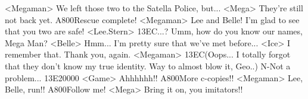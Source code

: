 <Megaman> We left those two to the Satella Police, but... 
<Mega> They're still not back yet. 
{A8}{00}Rescue complete! 
<Megaman> Lee and Belle! I'm glad to see that you two are safe! 
<Lee.Stern> {13}{EC}...? 
Umm, how do you know our names, Mega Man? 
<Belle> Hmm... I'm pretty sure that we've met before... 
<Ice> I remember that. 
Thank you, again. 
<Megaman> {13}{EC}(Oops...  I totally forgot that they 
 don't know my true identity.  Way to almost blow it, Geo..) 
N-Not a problem... 
{13}{E2}{00}{00} 
<Game> Ahhhhhh!! 
{A8}{00}More c-copies!! 
<Megaman> Lee, Belle, run!! 
{A8}{00}Follow me! 
<Mega> Bring it on, you imitators!! 
